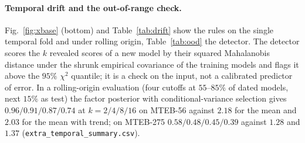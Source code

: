\paragraph{Temporal drift and the out-of-range check.} Fig.~\ref{fig:xbase} (bottom) and Table~\ref{tab:drift} show the rules on the single temporal fold and under rolling origin, Table~\ref{tab:ood} the detector. The detector scores the $k$ revealed scores of a new model by their squared Mahalanobis distance under the shrunk empirical covariance of the training models and flags it above the $95\%$ $\chi^2$ quantile; it is a check on the input, not a calibrated predictor of error. In a rolling-origin evaluation (four cutoffs at $55$--$85\%$ of dated models, next $15\%$ as test) the factor posterior with conditional-variance selection gives $0.96/0.91/0.87/0.74$ at $k=2/4/8/16$ on MTEB-56 against $2.18$ for the mean and $2.03$ for the mean with trend; on MTEB-275 $0.58/0.48/0.45/0.39$ against $1.28$ and $1.37$ (\texttt{extra\_temporal\_summary.csv}).
\begin{table}[h]
\caption{Out-of-range detector (selector: conditional variance; flag: squared Mahalanobis distance of the $k$ revealed scores above the $95\%$ $\chi^2$ quantile of the shrunk training covariance). AUC: of the distance for the worst tercile of the model's own nMSE (kernel ridge); mean nMSE of flagged and unflagged models with 95\% bootstrap CI over models (n/a: fewer than $3$ flagged).}
\label{tab:ood}
\centering\scriptsize\setlength{\tabcolsep}{3pt}

\end{table}
\begin{table}[h]
\caption{Temporal drift on MTEB-56 and MTEB-275 (dated models only). (a) Single temporal fold (train: earliest $4/5$, test: newest $\approx1/5$; conditional-variance selection): nMSE $\pm$ half-width of the 95\% CI over models for six inference rules, including a linear release-date trend added to the factor and OLS rules; the column mean ($k=0$) is in the last row of the block. (b) Rolling origin (cutoffs at $55,65,75,85\%$ of the dated models, the next $15\%$ as test, pooled over the four origins): random against conditional-variance selection, with the column mean and the column mean plus trend at $k=0$.}
\label{tab:drift}
\centering\tiny\setlength{\tabcolsep}{2pt}

\end{table}
